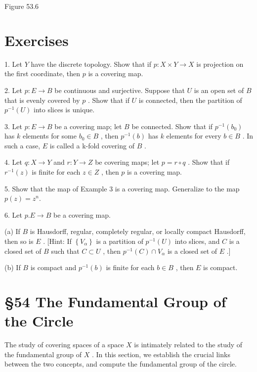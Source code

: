 \documentclass[10pt]{article}
\begin{document}
Figure 53.6

\section*{Exercises}

1. Let \(Y\) have the discrete topology. Show that if \(p : X \times  Y \rightarrow  X\) is projection on the first coordinate, then \(p\) is a covering map.

2. Let \(p : E \rightarrow  B\) be continuous and surjective. Suppose that \(U\) is an open set of \(B\) that is evenly covered by \(p\) . Show that if \(U\) is connected, then the partition of \({p}^{-1}\left( U\right)\) into slices is unique.

3. Let \(p : E \rightarrow  B\) be a covering map; let \(B\) be connected. Show that if \({p}^{-1}\left( {b}_{0}\right)\) has \(k\) elements for some \({b}_{0} \in  B\) , then \({p}^{-1}\left( b\right)\) has \(k\) elements for every \(b \in  B\) . In such a case, \(E\) is called a k-fold covering of \(B\) .

4. Let \(q : X \rightarrow  Y\) and \(r : Y \rightarrow  Z\) be covering maps; let \(p = r \circ  q\) . Show that if \({r}^{-1}\left( z\right)\) is finite for each \(z \in  Z\) , then \(p\) is a covering map.

5. Show that the map of Example 3 is a covering map. Generalize to the map \(p\left( z\right)  = {z}^{n}.\)

6. Let \(p.E \rightarrow  B\) be a covering map.

(a) If \(B\) is Hausdorff, regular, completely regular, or locally compact Hausdorff, then so is \(E\) . [Hint: If \(\left\{  {V}_{\alpha }\right\}\) is a partition of \({p}^{-1}\left( U\right)\) into slices, and \(C\) is a closed set of \(B\) such that \(C \subset  U\) , then \({p}^{-1}\left( C\right)  \cap  {V}_{\alpha }\) is a closed set of \(E\) .]

(b) If \(B\) is compact and \({p}^{-1}\left( b\right)\) is finite for each \(b \in  B\) , then \(E\) is compact.

\section*{§54 The Fundamental Group of the Circle}

The study of covering spaces of a space \(X\) is intimately related to the study of the fundamental group of \(X\) . In this section, we establish the crucial links between the two concepts, and compute the fundamental group of the circle.
\end{document}
